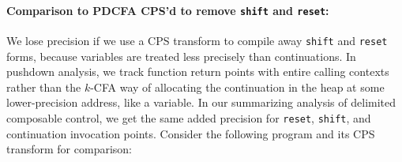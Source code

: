 \paragraph{Comparison to PDCFA CPS'd to remove {\tt shift} and {\tt reset}:}{
We lose precision if we use a CPS transform to compile away {\tt shift} and {\tt reset} forms, because variables are treated less precisely than continuations.
%
In pushdown analysis, we track function return points with entire calling contexts rather than the $k$-CFA way of allocating the continuation in the heap at some lower-precision address, like a variable.
%
In our summarizing analysis of delimited composable control, we get the same added precision for {\tt reset}, {\tt shift}, and continuation invocation points.
%
Consider the following program and its CPS transform for comparison:
\begin{SCodeFlow}\begin{RktBlk}\begin{SingleColumn}\RktPn{(}\mbox{}\RktPn{(}\RktPn{[}\mbox{}\RktPn{(}\RktSym{$\lambda$}\mbox{}\RktPn{(}\RktPn{)}\mbox{}\RktPn{)}\RktPn{]}

\mbox{}\RktPn{[}\mbox{}\RktPn{(}\RktSym{$\lambda$}\mbox{}\RktPn{(}\RktPn{)}\mbox{}\RktPn{(}\mbox{}\mbox{}\RktPn{(}\mbox{}\RktPn{(}\mbox{}\RktPn{)}\RktPn{)}\RktPn{)}\RktPn{)}\RktPn{]}

\mbox{}\RktPn{[}\mbox{}\RktPn{(}\RktSym{$\lambda$}\mbox{}\RktPn{(}\RktPn{)}\mbox{}\RktPn{(}\mbox{}\RktPn{(}\mbox{}\RktPn{(}\mbox{}\RktPn{)}\RktPn{)}\RktPn{)}\RktPn{)}\RktPn{]}\RktPn{)}

\mbox{}\RktPn{(}\RktSym{$\le$}\mbox{}\RktPn{(}\mbox{}\RktPn{)}\mbox{}\RktPn{(}\mbox{}\RktPn{)}\RktPn{)}\RktPn{)}\end{SingleColumn}\end{RktBlk}\end{SCodeFlow}

}
